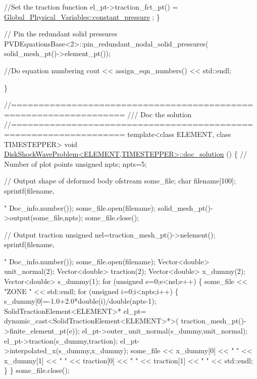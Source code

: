 \begin{DoxyCodeInclude}
   \textcolor{comment}{//Set the traction function}
   el\_pt->traction\_fct\_pt() = \hyperlink{namespaceGlobal__Physical__Variables_a19f4e20a92e7d216b4d2b00308f96917}{Global\_Physical\_Variables::constant\_pressure}
      ;
  \}

 \textcolor{comment}{// Pin the redundant solid pressures}
 PVDEquationsBase<2>::pin\_redundant\_nodal\_solid\_pressures(
  solid\_mesh\_pt()->element\_pt());


 \textcolor{comment}{//Do equation numbering}
 cout << assign\_eqn\_numbers() << std::endl; 

\}


\textcolor{comment}{//==================================================================}\textcolor{comment}{}
\textcolor{comment}{/// Doc the solution}
\textcolor{comment}{}\textcolor{comment}{//==================================================================}
\textcolor{keyword}{template}<\textcolor{keyword}{class} ELEMENT, \textcolor{keyword}{class} TIMESTEPPER>
\textcolor{keywordtype}{void} \hyperlink{classDiskShockWaveProblem_a7685309caac199d18f3f81468d9fcb23}{DiskShockWaveProblem<ELEMENT,TIMESTEPPER>::doc\_solution}
      ()
\{
 \textcolor{comment}{// Number of plot points}
 \textcolor{keywordtype}{unsigned} npts;
 npts=5; 

 \textcolor{comment}{// Output shape of deformed body}
 ofstream some\_file;
 \textcolor{keywordtype}{char} filename[100];
 sprintf(filename,\textcolor{stringliteral}{"%
         Doc\_info.number());
 some\_file.open(filename);
 solid\_mesh\_pt()->output(some\_file,npts);
 some\_file.close();


 \textcolor{comment}{// Output traction}
 \textcolor{keywordtype}{unsigned} nel=traction\_mesh\_pt()->nelement();
 sprintf(filename,\textcolor{stringliteral}{"%
         Doc\_info.number());
 some\_file.open(filename);
 Vector<double> unit\_normal(2);
 Vector<double> traction(2);
 Vector<double> x\_dummy(2);
 Vector<double> s\_dummy(1);
 \textcolor{keywordflow}{for} (\textcolor{keywordtype}{unsigned} e=0;e<nel;e++)
  \{
   some\_file << \textcolor{stringliteral}{"ZONE "} << std::endl;
   \textcolor{keywordflow}{for} (\textcolor{keywordtype}{unsigned} i=0;i<npts;i++)
    \{
     s\_dummy[0]=-1.0+2.0*double(i)/double(npts-1);
     SolidTractionElement<ELEMENT>* el\_pt=
      \textcolor{keyword}{dynamic\_cast<}SolidTractionElement<ELEMENT>*\textcolor{keyword}{>}(
       traction\_mesh\_pt()->finite\_element\_pt(e));
     el\_pt->outer\_unit\_normal(s\_dummy,unit\_normal);
     el\_pt->traction(s\_dummy,traction);
     el\_pt->interpolated\_x(s\_dummy,x\_dummy);
     some\_file << x\_dummy[0] << \textcolor{stringliteral}{" "} << x\_dummy[1] << \textcolor{stringliteral}{" "} 
               << traction[0] << \textcolor{stringliteral}{" "} << traction[1] << \textcolor{stringliteral}{" "}  
               << std::endl;
    \}
  \}
 some\_file.close(); 

}}
\end{DoxyCodeInclude}
